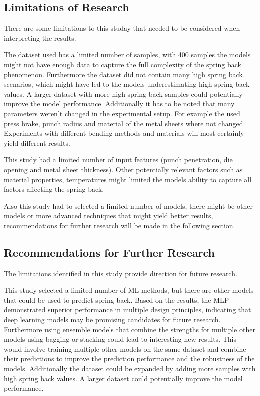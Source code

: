 \subsection{Limitations of Research}\label{subsec:limitations-of-research}
There are some limitations to this studay that needed to be considered when interpreting the results.

The dataset used has a limited number of samples, with 400 samples the models might not have enough data to capture
the full complexity of the spring back phenomenon.
Furthermore the dataset did not contain many high spring back scenarios, which might have led to the models
underestimating high spring back values.
A larger dataset with more high spring back samples could potentially improve the model performance.
Additionally it has to be noted that many parameters weren't changed in the experimental setup.
For example the used press brake, punch radius and material of the metal sheets where not changed.
Experiments with different bending methods and materials will most certainly yield different results.

This study had a limited number of input features (punch penetration, die opening and
metal sheet thickness).
Other potentially relevant factors such as material properties, temperatures might limited the models ability to
capture all factors affecting the spring back.

Also this study had to selected a limited number of models,
there might be other models or more advanced techniques that might yield better results, recommendations for further
research will be made in the following section.

\subsection{Recommendations for Further Research}\label{subsec:recommendations-for-further-research}
The limitations identified in this study provide direction for future research.

This study selected a limited number of \ac{ML} methods, but there are other models that could be used to
predict spring back.
Based on the results, the \ac{MLP} demonstrated superior performance in multiple design principles, indicating that
deep learning models may be promising candidates for future research.
Furthermore using ensemble models that combine the strengths for multiple other models using bagging or stacking could
lead to interesting new results.
This would involve training multiple other models on the same dataset and combine their predictions to improve the
prediction performance and the robustness of the models.
Additionally the dataset could be expanded by adding more samples with high spring back values.
A larger dataset could potentially improve the model performance.

